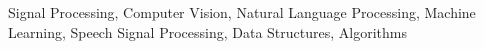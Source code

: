 \documentclass[10pt,a4paper,ragged2e,withhyper]{altacv}
\begin{document}
\begin{paracol}{2}
Signal Processing, Computer Vision, Natural Language Processing, Machine Learning, Speech Signal Processing, Data Structures, Algorithms











\end{paracol}
\end{document}
